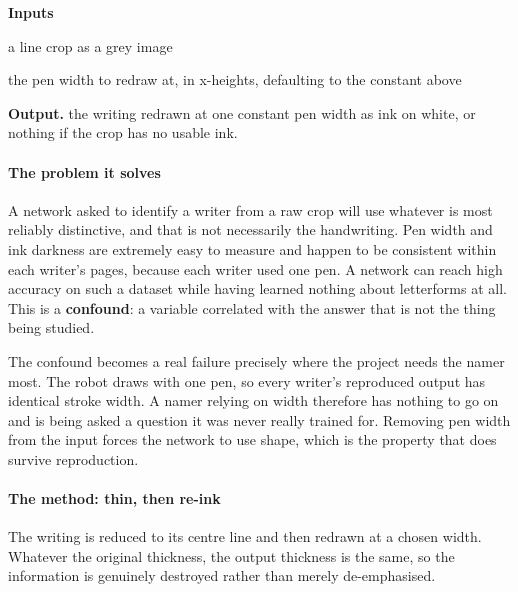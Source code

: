 \noindent\textbf{Inputs}
\begin{description}[leftmargin=2.2em,style=nextline,font=\normalfont\ttfamily]\setlength\itemsep{1pt}
  \item[{gray}] \normalfont a line crop as a grey image
  \item[{penWidthXh}] \normalfont the pen width to redraw at, in x-heights, defaulting to the constant above
\end{description}

\noindent\textbf{Output.} the writing redrawn at one constant pen width as ink on white, or nothing if the crop has no usable ink.


\paragraph{The problem it solves}
A network asked to identify a writer from a raw crop will use whatever is most reliably distinctive, and that is not necessarily the handwriting. Pen width and ink darkness are extremely easy to measure and happen to be consistent within each writer's pages, because each writer used one pen. A network can reach high accuracy on such a dataset while having learned nothing about letterforms at all. This is a \textbf{confound}: a variable correlated with the answer that is not the thing being studied.

The confound becomes a real failure precisely where the project needs the namer most. The robot draws with one pen, so every writer's reproduced output has identical stroke width. A namer relying on width therefore has nothing to go on and is being asked a question it was never really trained for. Removing pen width from the input forces the network to use shape, which is the property that does survive reproduction.


\paragraph{The method: thin, then re-ink}
The writing is reduced to its centre line and then redrawn at a chosen width. Whatever the original thickness, the output thickness is the same, so the information is genuinely destroyed rather than merely de-emphasised.


